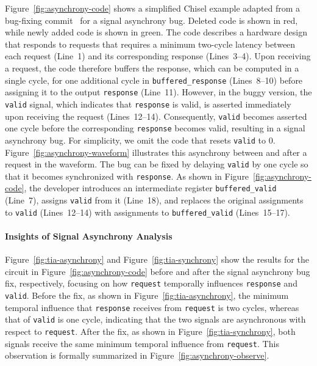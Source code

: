 Figure~\ref{fig:asynchrony-code} shows a simplified Chisel example adapted from a bug-fixing commit~\cite{sdspi} for a signal asynchrony bug.
Deleted code is shown in red, while newly added code is shown in green.
The code describes a hardware design that responds to requests that requires a minimum two-cycle latency between each request (Line~1) and its corresponding response (Lines~3--4).
Upon receiving a request, the code therefore buffers the response, which can be computed in a single cycle, for one additional cycle in \texttt{buffered\_response} (Lines~8--10) before assigning it to the output \texttt{response} (Line~11).
However, in the buggy version, the \texttt{valid} signal, which indicates that \texttt{response} is valid, is asserted immediately upon receiving the request (Lines~12--14).
Consequently, \texttt{valid} becomes asserted one cycle before the corresponding \texttt{response} becomes valid, resulting in a signal asynchrony bug.
For simplicity, we omit the code that resets \texttt{valid} to 0.
Figure~\ref{fig:asynchrony-waveform} illustrates this asynchrony between  and  after a request in the waveform.
The bug can be fixed by delaying \texttt{valid} by one cycle so that it becomes synchronized with \texttt{response}.
As shown in Figure~\ref{fig:asynchrony-code}, the developer introduces an intermediate register \texttt{buffered\_valid} (Line~7), assigns \texttt{valid} from it (Line~18), and replaces the original assignments to \texttt{valid} (Lines~12--14) with assignments to \texttt{buffered\_valid} (Lines~15--17).

\paragraph{Insights of Signal Asynchrony Analysis}

Figure~\ref{fig:tia-asynchrony} and Figure~\ref{fig:tia-synchrony} show the \tia results for the circuit in Figure~\ref{fig:asynchrony-code} before and after the signal asynchrony bug fix, respectively, focusing on how \texttt{request} temporally influences \texttt{response} and \texttt{valid}.
Before the fix, as shown in Figure~\ref{fig:tia-asynchrony}, the minimum temporal influence that \texttt{response} receives from \texttt{request} is two cycles, whereas that of \texttt{valid} is one cycle, indicating that the two signals are asynchronous with respect to \texttt{request}.
After the fix, as shown in Figure~\ref{fig:tia-synchrony}, both signals receive the same minimum temporal influence from \texttt{request}.
This observation is formally summarized in Figure~\ref{fig:asynchrony-observe}.

